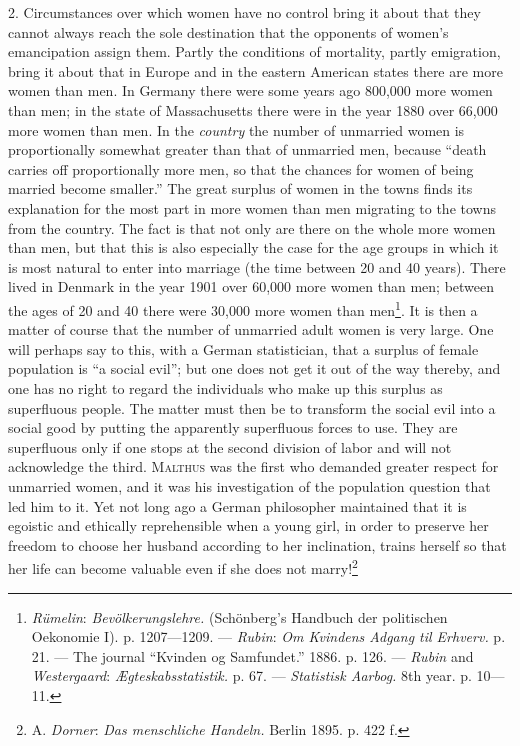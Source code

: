 \documentclass[12pt,a4paper,openany]{book}
\newcommand{\opage}[1]{\marginnote{\footnotesize\textit{[#1]}}}
\begin{document}
2. Circumstances over which women have no control bring it about that they cannot always reach the sole destination
that the opponents of women's emancipation assign them. Partly the conditions of mortality, partly emigration, bring it
about that in Europe and in the eastern American states there are more women than men. In Germany there were some years
ago 800,000 more women than men; in the state of Massachusetts there were in the year 1880 over 66,000 more women than
men. In the \emph{country} the number of unmarried women is proportionally somewhat greater than that of unmarried men,
because ``death carries off proportionally more men, so that the chances for women of being married become smaller.''
The great surplus of women in the towns finds its explanation for the most part in
\opage{318}more women than men migrating to the towns from the country. The fact is that not only are there on the
whole more women than men, but that this is also especially the case for the age groups in which it is most natural to
enter into marriage (the time between 20 and 40 years). There lived in Denmark in the year 1901 over 60,000 more women
than men; between the ages of 20 and 40 there were 30,000 more women than men\footnote[1]{\emph{Rümelin}:
\textit{Bevölkerungslehre.} (Schönberg's Handbuch der politischen Oekonomie I). p. 1207---1209. --- \emph{Rubin}:
\textit{Om Kvindens Adgang til Erhverv.} p. 21. --- The journal ``Kvinden og Samfundet.'' 1886. p. 126. --- \emph{Rubin}
and \emph{Westergaard}: \textit{Ægteskabsstatistik.} p. 67. --- \textit{Statistisk Aarbog.} 8th year. p. 10---11.}. It
is then a matter of course that the number of unmarried adult women is very large. One will perhaps say to this, with a
German statistician, that a surplus of female population is ``a social evil''; but one does not get it out of the way
thereby, and one has no right to regard the individuals who make up this surplus as superfluous people. The matter must
then be to transform the social evil into a social good by putting the apparently superfluous forces to use. They are
superfluous only if one stops at the second division of labor and will not acknowledge the third. \textsc{Malthus} was
the first who demanded greater respect for unmarried women, and it was his investigation of the population question
that led him to it. Yet not long ago a German philosopher maintained that it is egoistic and ethically reprehensible
when a young girl, in order to preserve her freedom to choose her husband according to her inclination, trains herself
so that her life can become valuable even if she does not marry!\footnote[2]{A. \emph{Dorner}: \textit{Das menschliche
Handeln.} Berlin 1895. p. 422 f.}
\end{document}
